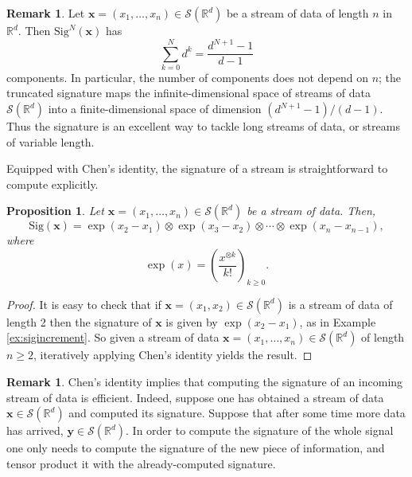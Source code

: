 \documentclass{article}
\theoremstyle{plain}
\newtheorem{proposition}[thm]{Proposition}
\theoremstyle{definition}
\newtheorem{remark}[thm]{Remark}
\begin{document}
\begin{remark}
	Let $\mathbf x = (x_1, \ldots, x_n) \in \mathcal S(\mathbb R^d)$ be a stream of data of length $n$ in $ \mathbb{R}^d $. Then $\mathrm{Sig}^N(\mathbf x)$ has
	\begin{equation*}
	\sum_{k = 0}^N d^k = \frac{d^{N+1} - 1}{d-1}
	\end{equation*}
	components. In particular, the number of components does not depend on $n$; the truncated signature maps the infinite-dimensional space of streams of data $\mathcal S(\mathbb R^d)$ into a finite-dimensional space of dimension $(d^{N+1} - 1)/(d-1)$. Thus the signature is an excellent way to tackle long streams of data, or streams of variable length.
\end{remark}

Equipped with Chen's identity, the signature of a stream is straightforward to compute explicitly.
\begin{proposition}
	Let $\mathbf x = (x_1, \ldots, x_n)\in \mathcal S(\mathbb R^d)$ be a stream of data. Then,
	\begin{equation*}
	\mathrm{Sig}(\mathbf x) = \exp(x_2 - x_1) \otimes \exp(x_3 - x_2) \otimes \cdots \otimes \exp(x_n - x_{n-1}),
	\end{equation*}
	where
	\[\exp(x) = \left(\frac{x^{\otimes k}}{k!}\right)_{k \geq 0}.\]
\end{proposition}
\begin{proof}
	It is easy to check that if $\mathbf x = (x_1, x_2)\in \mathcal S(\mathbb R^d)$ is a stream of data of length 2 then the signature of $\mathbf x$ is given by $\exp(x_2 - x_1)$, as in Example \ref{ex:sigincrement}. So given a stream of data $\mathbf x = (x_1, \ldots, x_n)\in \mathcal S(\mathbb R^d)$ of length $n \geq 2$, iteratively applying Chen's identity yields the result.
\end{proof}

\begin{remark} \label{re:efficiency}
	Chen's identity implies that computing the signature of an incoming stream of data is efficient. Indeed, suppose one has obtained a stream of data $\mathbf x\in \mathcal S(\mathbb R^d)$ and computed its signature. Suppose that after some time more data has arrived, $\mathbf y \in \mathcal S(\mathbb R^d)$. In order to compute the signature of the whole signal one only needs to compute the signature of the new piece of information, and tensor product it with the already-computed signature.
\end{remark}
\end{document}
